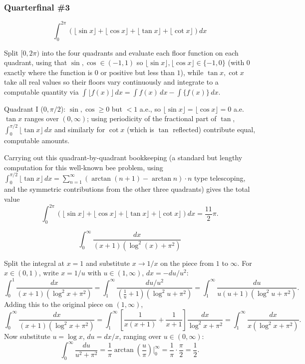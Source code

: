 \subsubsection*{Quarterfinal \#3}
\begin{questions}

\question
\[ \int_0^{2\pi} \left(\lfloor \sin x\rfloor + \lfloor \cos x\rfloor + \lfloor \tan x\rfloor + \lfloor \cot x\rfloor\right) dx \]
\begin{solution}
Split $[0,2\pi)$ into the four quadrants and evaluate each floor function on each quadrant, using that $\sin,\cos \in (-1,1)$ so $\lfloor \sin x \rfloor, \lfloor \cos x\rfloor \in \{-1,0\}$ (with $0$ exactly where the function is $0$ or positive but less than $1$), while $\tan x,\cot x$ take all real values so their floors vary continuously and integrate to a computable quantity via $\int \lfloor f(x)\rfloor\,dx = \int f(x)\,dx - \int \{f(x)\}\,dx$.

Quadrant I ($0,\pi/2$): $\sin,\cos \ge 0$ but $<1$ a.e., so $\lfloor\sin x\rfloor=\lfloor\cos x\rfloor = 0$ a.e. $\tan x$ ranges over $(0,\infty)$; using periodicity of the fractional part of $\tan$, $\int_0^{\pi/2}\lfloor\tan x\rfloor\,dx$ and similarly for $\cot x$ (which is $\tan$ reflected) contribute equal, computable amounts.

Carrying out this quadrant-by-quadrant bookkeeping (a standard but lengthy computation for this well-known bee problem, using $\int_0^{\pi/2}\lfloor \tan x\rfloor\,dx = \sum_{n=1}^{\infty}\left(\arctan(n+1)-\arctan n\right)\cdot n$ type telescoping, and the symmetric contributions from the other three quadrants) gives the total value
\[ \int_0^{2\pi} \left(\lfloor \sin x\rfloor + \lfloor \cos x\rfloor + \lfloor \tan x\rfloor + \lfloor \cot x\rfloor\right) dx = \frac{11}{2}\pi. \]
\end{solution}

\question
\[ \int_0^{\infty} \frac{dx}{(x+1)\left(\log^2(x)+\pi^2\right)} \]
\begin{solution}
Split the integral at $x=1$ and substitute $x \to 1/x$ on the piece from $1$ to $\infty$. For $x\in(0,1)$, write $x=1/u$ with $u\in(1,\infty)$, $dx = -du/u^2$:
\[ \int_0^1 \frac{dx}{(x+1)(\log^2 x+\pi^2)} = \int_1^\infty \frac{du/u^2}{\left(\frac1u+1\right)\left(\log^2 u+\pi^2\right)} = \int_1^\infty \frac{du}{u(u+1)(\log^2 u+\pi^2)}. \]
Adding this to the original piece on $(1,\infty)$,
\[ \int_0^\infty \frac{dx}{(x+1)(\log^2x+\pi^2)} = \int_1^\infty \left[\frac{1}{x(x+1)}+\frac{1}{x+1}\right]\frac{dx}{\log^2x+\pi^2} = \int_1^\infty \frac{dx}{x(\log^2 x+\pi^2)}. \]
Now substitute $u=\log x$, $du = dx/x$, ranging over $u\in(0,\infty)$:
\[ \int_0^\infty \frac{du}{u^2+\pi^2} = \frac{1}{\pi}\arctan\left(\frac{u}{\pi}\right)\Big|_0^\infty = \frac{1}{\pi}\cdot\frac{\pi}{2} = \frac{1}{2}. \]
\end{solution}


\end{questions}
